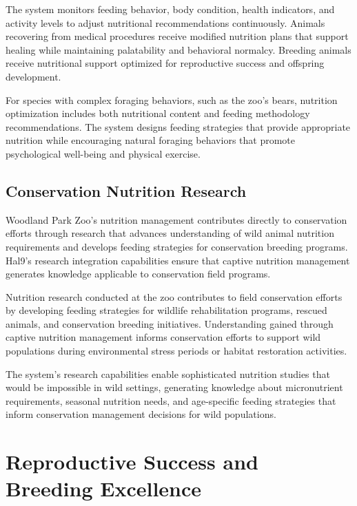 \documentclass[
  Letterpaper,
]{scrbook}
\begin{document}
The system monitors feeding behavior, body condition, health indicators,
and activity levels to adjust nutritional recommendations continuously.
Animals recovering from medical procedures receive modified nutrition
plans that support healing while maintaining palatability and behavioral
normalcy. Breeding animals receive nutritional support optimized for
reproductive success and offspring development.

For species with complex foraging behaviors, such as the zoo's bears,
nutrition optimization includes both nutritional content and feeding
methodology recommendations. The system designs feeding strategies that
provide appropriate nutrition while encouraging natural foraging
behaviors that promote psychological well-being and physical exercise.

\subsection{Conservation Nutrition
Research}\label{conservation-nutrition-research}

Woodland Park Zoo's nutrition management contributes directly to
conservation efforts through research that advances understanding of
wild animal nutrition requirements and develops feeding strategies for
conservation breeding programs. Hal9's research integration capabilities
ensure that captive nutrition management generates knowledge applicable
to conservation field programs.

Nutrition research conducted at the zoo contributes to field
conservation efforts by developing feeding strategies for wildlife
rehabilitation programs, rescued animals, and conservation breeding
initiatives. Understanding gained through captive nutrition management
informs conservation efforts to support wild populations during
environmental stress periods or habitat restoration activities.

The system's research capabilities enable sophisticated nutrition
studies that would be impossible in wild settings, generating knowledge
about micronutrient requirements, seasonal nutrition needs, and
age-specific feeding strategies that inform conservation management
decisions for wild populations.

\section{Reproductive Success and Breeding
Excellence}\label{reproductive-success-and-breeding-excellence}
\end{document}
